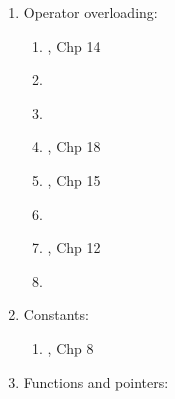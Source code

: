 \begin{enumerate}
	\begin{enumerate} \itemsep -2pt
	\item \cite{Stroustrup2014}, Chp 8
	\item \cite[\S6.14, pp. 356--360]{Gaddis2012}.
	\item \cite[\S6.14, pp. 359--363]{Gaddis2011}.
	\item \cite{Gaddis2010}, Chp 6.
	\item \cite[\S4.4, pp. 230--243]{Savitch2009}
	\item \cite{Stroustrup2009}, Chp 8
	\item \cite[pp. 216--217, 365--370]{Prata2005}. Function overloading is also known as function polymorphism \cite[pp. 388]{Prata2005}.
	\item \cite{Schildt2003}, Chp 14
	\item \cite{Eckel2000}, Chp 7
	\item \cite[Chp. 14, pp. 361--384]{Schildt1998a}
	\end{enumerate}
\item Operator overloading: \vspace{-0.3cm}
	\begin{enumerate} \itemsep -2pt
	\item \cite{Lippman2013}, Chp 14
	\item \cite[\S11.2, pp. 633--651]{Savitch2009}
	\item \cite[pp. 502--515, 524--537]{Prata2005}
	\item \cite{Oualline2003}, Chp 18
	\item \cite{Schildt2003}, Chp 15
	\item \cite[Chp. 13, pp. 299--330]{Schildt2003a}
	\item \cite{Eckel2000}, Chp 12
	\item \cite[Chp. 15, pp. 385--418]{Schildt1998a}
	\end{enumerate}
\item Constants: \vspace{-0.3cm}
	\begin{enumerate} \itemsep -2pt
	\item \cite{Eckel2000}, Chp 8
	\end{enumerate}
\item Functions and pointers: \vspace{-0.3cm}
	\begin{enumerate} \itemsep -2pt

\end{enumerate}
\end{enumerate}
